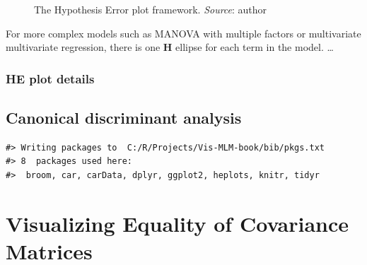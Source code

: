 \documentclass[
  letterpaper,
  10pt,
  krantz2]{krantz}
\begin{document}
\begin{figure}


\caption{\label{fig-HE-framework}The Hypothesis Error plot framework.
\emph{Source}: author}

\end{figure}%

For more complex models such as MANOVA with multiple factors or
multivariate multivariate regression, there is one \(\mathbf{H}\)
ellipse for each term in the model. \ldots{}

\subsection{HE plot details}\label{he-plot-details}

\section{Canonical discriminant analysis}\label{sec-candisc}

\begin{verbatim}
#> Writing packages to  C:/R/Projects/Vis-MLM-book/bib/pkgs.txt
#> 8  packages used here:
#>  broom, car, carData, dplyr, ggplot2, heplots, knitr, tidyr
\end{verbatim}


\chapter{Visualizing Equality of Covariance Matrices}\label{sec-eqcov}
\end{document}

